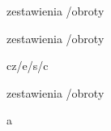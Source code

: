\documentclass[polish,a4paper,11pt,oneside]{article}
\begin{document}
zestawienia /obroty

\prefixing
zestawienia /obroty

cz/e/s/c

\nonprefixing
zestawienia /obroty

\PLSlash a
\end{document}
